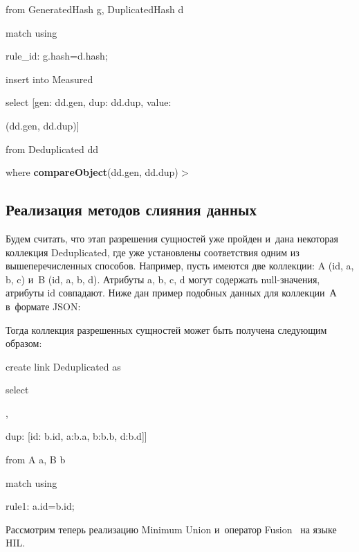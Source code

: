 \begin{multicols}{2}
{\noindent
  from GeneratedHash g, DuplicatedHash d

\noindent
  match using

\noindent
  \hspace*{3pt}rule\_id: g.hash\;=\;d.hash;

\noindent
  insert into Measured

\noindent
  select [gen: dd.gen, dup: dd.dup, value:

  \noindent
  (dd.gen, dd.dup)]

\noindent
  from Deduplicated dd

\noindent
  where {\textbf{compareObject}}(dd.gen, dd.dup)\;$>$
  }

  \subsection{Реализация методов слияния данных}

     Будем считать, что этап разрешения сущностей уже пройден и~дана некоторая
коллекция Deduplicated, где уже установлены соответствия одним из вышеперечисленных
способов. Например, пусть имеются две коллекции: A (id, a, b, c) и~B (id, a, b, d). Атрибуты
a, b, c, d могут содержать null-значения, атрибуты id совпадают. Ниже дан пример подобных
данных для коллекции~А в~формате JSON:

{\sf
{}
}
  Тогда коллекция разрешенных сущностей может быть получена следующим образом:

{\sf
\noindent
  create link Deduplicated as

\noindent
  select


\noindent
[gen: [id: a.id, a:a.a, b:a.b, c:a.c],

\noindent
  dup:  [id: b.id, a:b.a, b:b.b, d:b.d]]

\noindent
  from A a, B b

\noindent
  match using

\noindent
  \hspace*{3pt}rule1: a.id\;=\;b.id;
  }

  Рассмотрим теперь реализацию Minimum Union и~оператор Fusion~\cite{13-vov} на языке
HIL.


\end{multicols}

